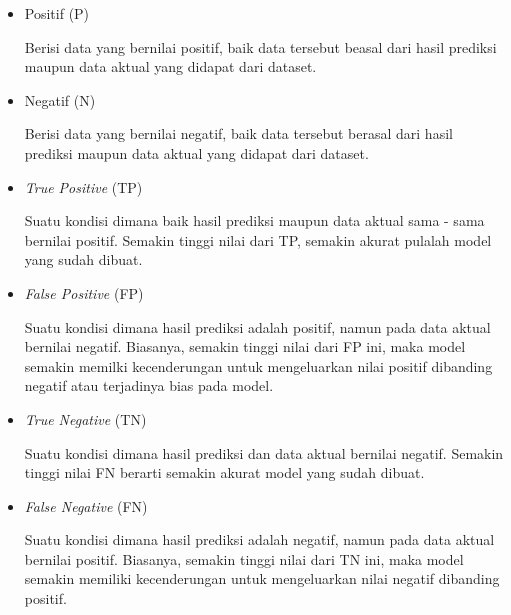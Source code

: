 \begin{itemize}[nolistsep]
    \item Positif (P)

          Berisi data yang bernilai positif, baik data tersebut beasal dari hasil prediksi maupun data aktual yang didapat dari dataset.

    \item Negatif (N)

          Berisi data yang bernilai negatif, baik data tersebut berasal dari hasil prediksi maupun data aktual yang didapat dari dataset.

    \item \textit{True Positive} (TP)

          Suatu kondisi dimana baik hasil prediksi maupun data aktual sama - sama bernilai positif. Semakin tinggi nilai dari TP, semakin akurat pulalah model yang sudah dibuat.

    \item \textit{False Positive} (FP)

          Suatu kondisi dimana hasil prediksi adalah positif, namun pada data aktual bernilai negatif. Biasanya, semakin tinggi nilai dari FP ini, maka model semakin memilki kecenderungan untuk mengeluarkan nilai positif dibanding negatif atau terjadinya bias pada model.

    \item \textit{True Negative} (TN)

          Suatu kondisi dimana hasil prediksi dan data aktual bernilai negatif. Semakin tinggi nilai FN berarti semakin akurat model yang sudah dibuat.

    \item \textit{False Negative} (FN)

          Suatu kondisi dimana hasil prediksi adalah negatif, namun pada data aktual bernilai positif. Biasanya, semakin tinggi nilai dari TN ini, maka model semakin memiliki kecenderungan untuk mengeluarkan nilai negatif dibanding positif.


\end{itemize}
